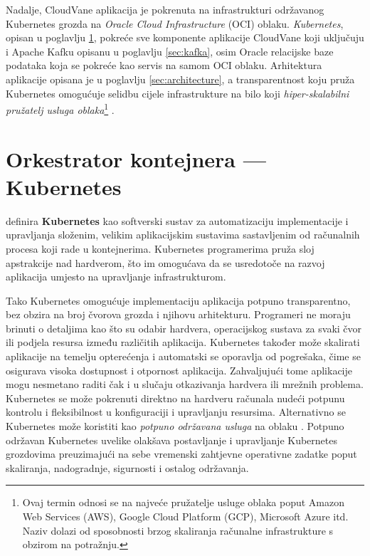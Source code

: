 \documentclass[times, utf8, diplomski]{fer}
\begin{document}
Nadalje, CloudVane aplikacija je pokrenuta na infrastrukturi održavanog Kubernetes grozda  na \emph{Oracle Cloud Infrastructure} (OCI) oblaku. \emph{Kubernetes}, opisan u poglavlju \ref{sec:k8s}, pokreće sve komponente aplikacije CloudVane koji uključuju i Apache Kafku opisanu u poglavlju \ref{sec:kafka}, osim Oracle relacijske baze podataka koja se pokreće kao servis na samom OCI oblaku. Arhitektura aplikacije opisana je u poglavlju \ref{sec:architecture}, a transparentnost koju pruža Kubernetes omogućuje selidbu cijele infrastrukture na bilo koji \emph{hiper-skalabilni pružatelj usluga oblaka}\footnote{Ovaj termin odnosi se na najveće pružatelje usluge oblaka poput Amazon Web Services (AWS), Google Cloud Platform (GCP), Microsoft Azure itd. Naziv dolazi od sposobnosti brzog skaliranja računalne infrastrukture s obzirom na potražnju.} .

\clearpage
\section{Orkestrator kontejnera --- Kubernetes}
\label{sec:k8s}

\citet{luksa_kubernetes_2023} definira \textbf{Kubernetes} kao softverski sustav za automatizaciju implementacije  i upravljanja složenim, velikim aplikacijskim sustavima sastavljenim od računalnih procesa koji rade u kontejnerima.
Kubernetes programerima pruža sloj apstrakcije nad hardverom, što im omogućava da se usredotoče na razvoj aplikacija umjesto na upravljanje infrastrukturom.

Tako Kubernetes omogućuje implementaciju aplikacija potpuno transparentno, bez obzira na broj čvorova grozda i njihovu arhitekturu. Programeri ne moraju brinuti o detaljima kao što su odabir hardvera, operacijskog sustava za svaki čvor ili podjela resursa između različitih aplikacija. Kubernetes također može skalirati aplikacije na temelju opterećenja i automatski se oporavlja od pogrešaka, čime se osigurava visoka dostupnost i otpornost aplikacija. Zahvaljujući tome aplikacije mogu nesmetano raditi čak i u slučaju otkazivanja hardvera ili mrežnih problema.\\

Kubernetes se može pokrenuti direktno na hardveru računala nudeći potpunu kontrolu i fleksibilnost u konfiguraciji i upravljanju resursima. Alternativno se Kubernetes može koristiti kao \emph{potpuno održavana usluga}  na oblaku . Potpuno održavan Kubernetes uvelike olakšava postavljanje i upravljanje Kubernetes grozdovima preuzimajući na sebe vremenski zahtjevne operativne zadatke poput skaliranja, nadogradnje, sigurnosti i ostalog održavanja.
\end{document}
